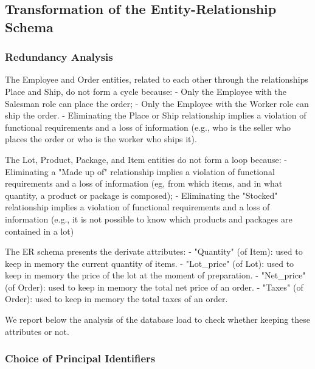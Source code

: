 \subsection{Transformation of the Entity-Relationship Schema}

\subsubsection{Redundancy Analysis}

The Employee and Order entities, related to each other through the relationships Place and Ship, do not form a cycle because:
- Only the Employee with the Salesman role can place the order;
- Only the Employee with the Worker role can ship the order.
- Eliminating the Place or Ship relationship implies a violation of functional requirements and a loss of information (e.g., who is the seller who places the order or who is the worker who ships it).

The Lot, Product, Package, and Item entities do not form a loop because:
- Eliminating a "Made up of" relationship implies a violation of functional requirements and a loss of information (eg, from which items, and in what quantity, a product or package is composed);
- Eliminating the "Stocked" relationship implies a violation of functional requirements and a loss of information (e.g., it is not possible to know which products and packages are contained in a lot)

The ER schema presents the derivate attributes:
- "Quantity" (of Item): used to keep in memory the current quantity of items.
- "Lot_price" (of Lot): used to keep in memory the price of the lot at the moment of preparation.
- "Net_price" (of Order): used to keep in memory the total net price of an order.
- "Taxes" (of Order): used to keep in memory the total taxes of an order.

We report below the analysis of the database load to check whether keeping these attributes or not.

\subsubsection{Choice of Principal Identifiers}